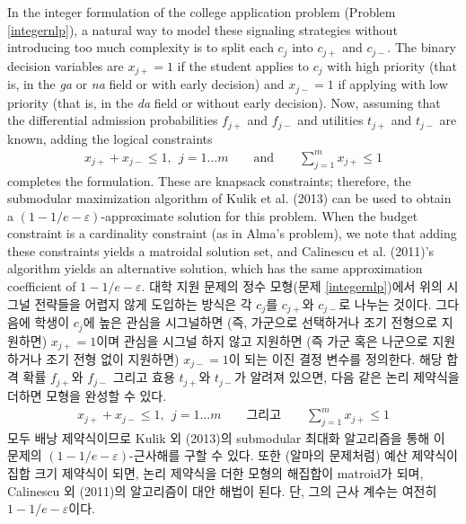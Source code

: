 \documentclass[11pt]{article} %
\theoremstyle{definition}
\theoremstyle{definition}
\begin{document}
\ifen
In the integer formulation of the college application problem (Problem \ref{integernlp}), a natural way to model these signaling strategies without introducing too much complexity is to split each $c_j$ into $c_{j+}$ and $c_{j-}$. The binary decision variables are $x_{j+} = 1$ if the student applies to $c_j$ with high priority (that is, in  the \emph{ga} or \emph{na} field or with early decision) and $x_{j-} = 1$ if applying with low priority (that is, in the \emph{da} field or without early decision). Now, assuming that the differential admission probabilities $f_{j+}$ and $f_{j-}$ and utilities $t_{j+}$ and $t_{j-}$ are known, adding the logical constraints 
\begin{align}
 x_{j+} + x_{j-} \leq 1, ~~ j = 1\dots m\qquad\text{and}\qquad\sum_{j=1}^m x_{j+} \leq 1
\end{align}
completes the formulation. These are knapsack constraints; therefore, the submodular maximization algorithm of Kulik et al. (2013) can be used to obtain a $(1 - 1/e - \varepsilon)$-approximate solution for this problem. When the budget constraint is a cardinality constraint (as in Alma's problem), we note that adding these constraints yields a matroidal solution set, and Calinescu et al. (2011)'s algorithm yields an alternative solution, which has the same approximation coefficient of $1 - 1/e -\varepsilon$. %
\else
대학 지원 문제의 정수 모형(문제 \ref{integernlp})에서 위의 시그널 전략들을 어렵지 않게 도입하는 방식은 각 $c_j$를 $c_{j+}$와 $c_{j-}$로 나누는 것이다. 그다음에 학생이 $c_j$에 높은 관심을 시그널하면 (즉, 가군으로 선택하거나 조기 전형으로 지원하면) $x_{j+} = 1$이며 관심을 시그널 하지 않고 지원하면 (즉 가군 혹은 나군으로 지원하거나 조기 전형 없이 지원하면) $x_{j-} = 1$이 되는 이진 결정 변수를 정의한다. 해당 합격 확률 $f_{j+}$와 $f_{j-}$ 그리고 효용  $t_{j+}$와 $t_{j-}$가 알려져 있으면, 다음 같은 논리 제약식을 더하면 모형을 완성할 수 있다. 
\begin{align}
 x_{j+} + x_{j-} \leq 1, ~~ j = 1\dots m\qquad\text{그리고}\qquad\sum_{j=1}^m x_{j+} \leq 1
\end{align}
모두 배낭 제약식이므로 Kulik 외 (2013)의 submodular 최대화 알고리즘을 통해 이 문제의 $(1 - 1/e - \varepsilon)$-근사해를 구할 수 있다. 또한 (알마의 문제처럼) 예산 제약식이 집합 크기 제약식이 되면, 논리 제약식을 더한 모형의 해집합이 matroid가 되며, Calinescu 외 (2011)의 알고리즘이 대안 해법이 된다. 단, 그의 근사 계수는 여전히 $1 - 1/e - \varepsilon$이다. 
\fi
\end{document}
